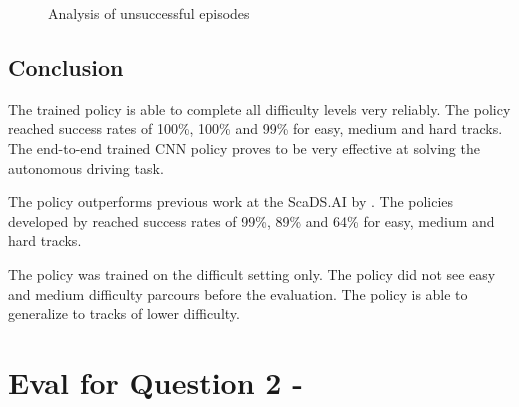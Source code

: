 \begin{figure}
    \centering
    \caption{Analysis of unsuccessful episodes}
    \label{fig:unsuccessful_episodes}
\end{figure}



\subsection{Conclusion}

The trained policy is able to complete all difficulty levels very reliably. The policy reached success rates of 100\%, 100\% and 99\% for easy, medium and hard tracks. The end-to-end trained \acs{CNN} policy proves to be very effective at solving the autonomous driving task.

The policy outperforms previous work at the ScaDS.AI by \textcite{maximilian}. The policies developed by \textcite{maximilian} reached success rates of 99\%, 89\% and 64\% for easy, medium and hard tracks.

The policy was trained on the difficult setting only. The policy did not see easy and medium difficulty parcours before the evaluation. The policy is able to generalize to tracks of lower difficulty.

\section{Eval for Question 2 - \questionTwo}

